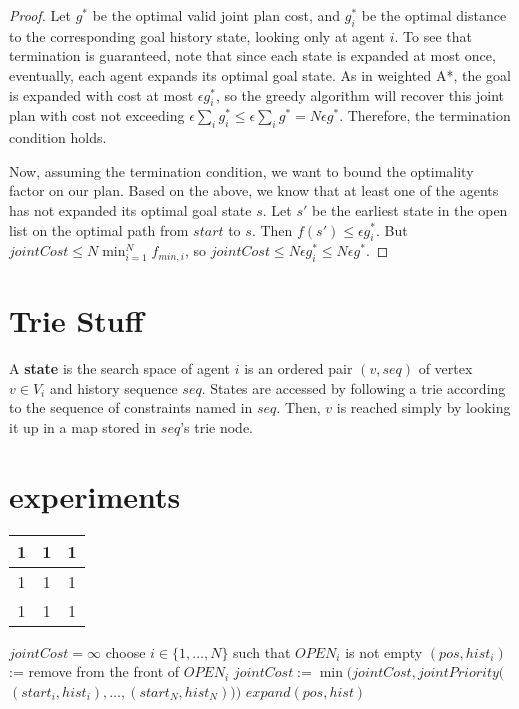 \documentclass[letterpaper]{article}
\begin{document}
\begin{proof}
Let $g^*$ be the optimal valid joint plan cost, and $g_i^*$ be the optimal distance to the corresponding goal history state, looking only at agent $i$. To see that termination is guaranteed, note that since each state is expanded at most once, eventually, each agent expands its optimal goal state. As in weighted A*, the goal is expanded with cost at most $\epsilon g_i^*$, so the greedy algorithm will recover this joint plan with cost not exceeding $\epsilon \sum_i g_i^* \le \epsilon \sum_i g^* = N\epsilon g^*$. Therefore, the termination condition holds.

Now, assuming the termination condition, we want to bound the optimality factor on our plan. Based on the above, we know that at least one of the agents has not expanded its optimal goal state $s$. Let $s'$ be the earliest state in the open list on the optimal path from $start$ to $s$. Then $f(s') \le \epsilon g_i^*$. But $jointCost \le N \min_{i=1}^N f_{min,i}$, so $jointCost \le N \epsilon g_i^* \le N\epsilon g^*$.
\end{proof}

\section{Trie Stuff}
A \textbf{state} is the search space of agent $i$ is an ordered pair $(v, seq)$ of vertex $v\in V_i$ and history sequence $seq$. States are accessed by following a trie according to the sequence of constraints named in $seq$. Then, $v$ is reached simply by looking it up in a map stored in $seq$'s trie node.

\section{experiments}

\begin{tabular} {c|c|c} \hline
1 & 1 & 1 \\ \hline
1 & 1 & 1 \\ \hline
1 & 1 & 1 \\ \hline
\end{tabular}

\begin{algorithm}
\caption{$search()$}
\label{alg:update}
\begin{algorithmic}
\STATE $jointCost = \infty$
\STATE choose $i\in\{1,\ldots,N\}$ such that $OPEN_{i}$ is not empty
\STATE $(pos, hist_i)$ := remove from the front of $OPEN_{i}$
\STATE $jointCost := \min(jointCost,jointPriority($\\\qquad$(start_i,hist_i),\ldots,(start_N,hist_N)))$
\ENDFOR
\ENDIF
\STATE $expand(pos, hist)$
\ENDWHILE
\end{algorithmic}
\end{algorithm}
\end{document}

